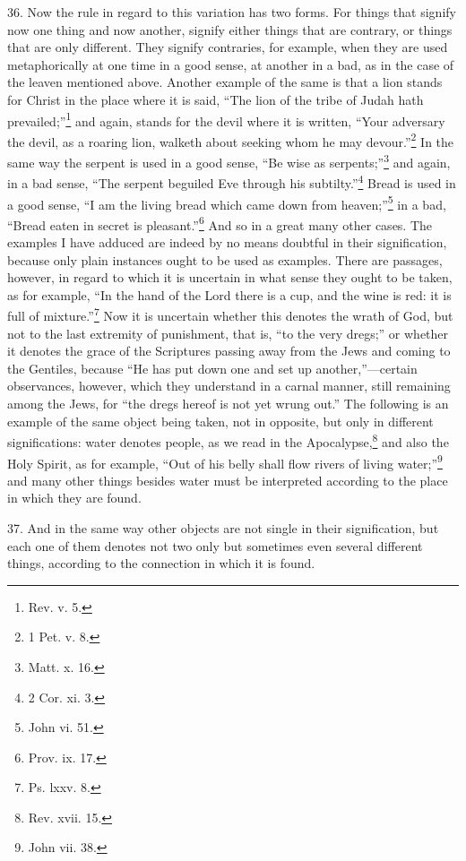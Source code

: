 36. Now the rule in regard to this variation has two forms. For things that signify now one thing and now another, signify either things that are contrary, or things that are only different. They signify contraries, for example, when they are used metaphorically at one time in a good sense, at another in a bad, as in the case of the leaven mentioned above. Another example of the same is that a lion stands for Christ in the place where it is said, “The lion of the tribe of Judah hath prevailed;”\footnote{Rev. v. 5.} and again, stands for the devil where it is written, “Your adversary the devil, as a roaring lion, walketh about seeking whom he may devour.”\footnote{1 Pet. v. 8.} In the same way the serpent is used in a good sense, “Be wise as serpents;”\footnote{Matt. x. 16.} and again, in a bad sense, “The serpent beguiled Eve through his subtilty.”\footnote{2 Cor. xi. 3.} Bread is used in a good sense, “I am the living bread which came down from heaven;”\footnote{John vi. 51.} in a bad, “Bread eaten in secret is pleasant.”\footnote{Prov. ix. 17.} And so in a great many other cases. The examples I have adduced are indeed by no means doubtful in their signification, because only plain instances ought to be used as examples. There are passages, however, in regard to which it is uncertain in what sense they ought to be taken, as for example, “In the hand of the Lord there is a cup, and the wine is red: it is full of mixture.”\footnote{Ps. lxxv. 8.} Now it is uncertain whether this denotes the wrath of God, but not to the last extremity of punishment, that is, “to the very dregs;” or whether it denotes the grace of the Scriptures passing away from the Jews and coming to the Gentiles, because “He has put down one and set up another,”—certain observances, however, which they understand in a carnal manner, still remaining among the Jews, for “the dregs hereof is not yet wrung out.” The following is an example of the same object being taken, not in opposite, but only in different significations: water denotes people, as we read in the Apocalypse,\footnote{Rev. xvii. 15.} and also the Holy Spirit, as for example, “Out of his belly shall flow rivers of living water;”\footnote{John vii. 38.} and many other things besides water must be interpreted according to the place in which they are found.

37. And in the same way other objects are not single in their signification, but each one of them denotes not two only but sometimes even several different things, according to the connection in which it is found.

